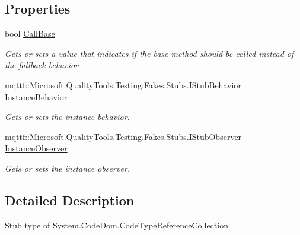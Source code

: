 \subsection*{Properties}
\begin{DoxyCompactItemize}
\item 
bool \hyperlink{class_system_1_1_code_dom_1_1_fakes_1_1_stub_code_type_reference_collection_a25f68abfbb23bc54346a668f58faed6d}{Call\-Base}
\begin{DoxyCompactList}\small\item\em Gets or sets a value that indicates if the base method should be called instead of the fallback behavior\end{DoxyCompactList}\item 
mqttf\-::\-Microsoft.\-Quality\-Tools.\-Testing.\-Fakes.\-Stubs.\-I\-Stub\-Behavior \hyperlink{class_system_1_1_code_dom_1_1_fakes_1_1_stub_code_type_reference_collection_a91b4dfcb06e546599de56bcebc00fabf}{Instance\-Behavior}
\begin{DoxyCompactList}\small\item\em Gets or sets the instance behavior.\end{DoxyCompactList}\item 
mqttf\-::\-Microsoft.\-Quality\-Tools.\-Testing.\-Fakes.\-Stubs.\-I\-Stub\-Observer \hyperlink{class_system_1_1_code_dom_1_1_fakes_1_1_stub_code_type_reference_collection_a0edc917032d339dc9972ccc1490642df}{Instance\-Observer}
\begin{DoxyCompactList}\small\item\em Gets or sets the instance observer.\end{DoxyCompactList}\end{DoxyCompactItemize}


\subsection{Detailed Description}
Stub type of System.\-Code\-Dom.\-Code\-Type\-Reference\-Collection



